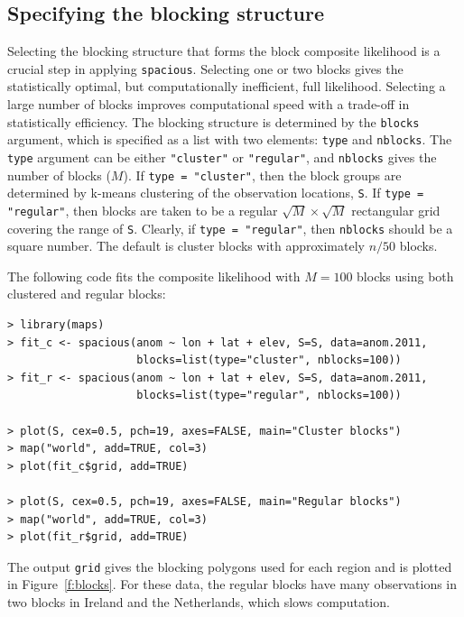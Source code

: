 \documentclass[11pt]{article}
\begin{document}
\subsection{Specifying the blocking structure}

Selecting the blocking structure that forms the block composite likelihood is a crucial step in applying {\tt spacious}.
Selecting one or two blocks gives the statistically optimal, but computationally inefficient, full likelihood.
Selecting a large number of blocks improves computational speed with a trade-off in statistically efficiency.
The blocking structure is determined by the {\tt blocks} argument, which is specified as a list with two elements: {\tt type} and {\tt nblocks}.
The {\tt type} argument can be either {\tt "cluster"} or {\tt "regular"}, and {\tt nblocks} gives the number of blocks ($M$).
If {\tt type = "cluster"}, then the block groups are determined by k-means clustering of the observation locations, {\tt S}.
If {\tt type = "regular"}, then blocks are taken to be a regular $\sqrt{M}\times\sqrt{M}$ rectangular grid covering the range of {\tt S}.
Clearly, if {\tt type = "regular"}, then {\tt nblocks} should be a square number.
The default is cluster blocks with approximately $n/50$ blocks.

The following code fits the composite likelihood with $M=100$ blocks using both clustered and regular blocks:

\begin{verbatim}
> library(maps)
> fit_c <- spacious(anom ~ lon + lat + elev, S=S, data=anom.2011,
                    blocks=list(type="cluster", nblocks=100))
> fit_r <- spacious(anom ~ lon + lat + elev, S=S, data=anom.2011,
                    blocks=list(type="regular", nblocks=100))

> plot(S, cex=0.5, pch=19, axes=FALSE, main="Cluster blocks")
> map("world", add=TRUE, col=3)
> plot(fit_c$grid, add=TRUE)

> plot(S, cex=0.5, pch=19, axes=FALSE, main="Regular blocks")
> map("world", add=TRUE, col=3)
> plot(fit_r$grid, add=TRUE)
\end{verbatim}

The output {\tt grid} gives the blocking polygons used for each region and is plotted in Figure~\ref{f:blocks}.
For these data, the regular blocks have many observations in two blocks in Ireland and the Netherlands, which slows computation.
\end{document}
